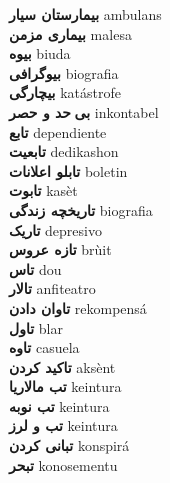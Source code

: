 \textbf{ بیمارستان سیار  } ambulans \\
\textbf{ بیماری مزمن  } malesa \\
\textbf{ بیوه  } biuda \\
\textbf{ بیوگرافی  } biografia \\
\textbf{ بیچارگی  } katástrofe \\
\textbf{ بی حد و حصر  } inkontabel \\
\textbf{ تابع  } dependiente \\
\textbf{ تابعیت  } dedikashon \\
\textbf{ تابلو اعلانات  } boletin \\
\textbf{ تابوت  } kasèt \\
\textbf{ تاریخچه زندگی  } biografia \\
\textbf{ تاریک  } depresivo \\
\textbf{ تازه عروس  } brùit \\
\textbf{ تاس  } dou \\
\textbf{ تالار  } anfiteatro \\
\textbf{ تاوان دادن  } rekompensá \\
\textbf{ تاول  } blar \\
\textbf{ تاوه  } casuela \\
\textbf{ تاکید کردن  } aksènt \\
\textbf{ تب مالاریا  } keintura \\
\textbf{ تب نوبه  } keintura \\
\textbf{ تب و لرز  } keintura \\
\textbf{ تبانی کردن  } konspirá \\
\textbf{ تبحر  } konosementu \\
